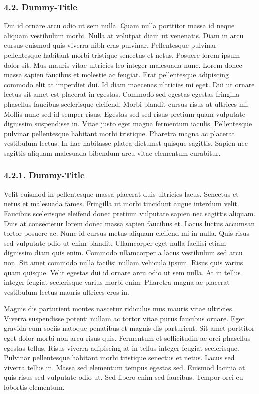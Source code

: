 \documentclass[
]{article}
\begin{document}
\hypertarget{dummy-title-4}{%
\subsubsection{4.2. Dummy-Title}\label{dummy-title-4}}

Dui id ornare arcu odio ut sem nulla. Quam nulla porttitor massa id
neque aliquam vestibulum morbi. Nulla at volutpat diam ut venenatis.
Diam in arcu cursus euismod quis viverra nibh cras pulvinar.
Pellentesque pulvinar pellentesque habitant morbi tristique senectus et
netus. Posuere lorem ipsum dolor sit. Mus mauris vitae ultricies leo
integer malesuada nunc. Lorem donec massa sapien faucibus et molestie ac
feugiat. Erat pellentesque adipiscing commodo elit at imperdiet dui. Id
diam maecenas ultricies mi eget. Dui ut ornare lectus sit amet est
placerat in egestas. Commodo sed egestas egestas fringilla phasellus
faucibus scelerisque eleifend. Morbi blandit cursus risus at ultrices
mi. Mollis nunc sed id semper risus. Egestas sed sed risus pretium quam
vulputate dignissim suspendisse in. Vitae justo eget magna fermentum
iaculis. Pellentesque pulvinar pellentesque habitant morbi tristique.
Pharetra magna ac placerat vestibulum lectus. In hac habitasse platea
dictumst quisque sagittis. Sapien nec sagittis aliquam malesuada
bibendum arcu vitae elementum curabitur.

\hypertarget{dummy-title-5}{%
\subsubsection{4.2.1. Dummy-Title}\label{dummy-title-5}}

Velit euismod in pellentesque massa placerat duis ultricies lacus.
Senectus et netus et malesuada fames. Fringilla ut morbi tincidunt augue
interdum velit. Faucibus scelerisque eleifend donec pretium vulputate
sapien nec sagittis aliquam. Duis at consectetur lorem donec massa
sapien faucibus et. Lacus luctus accumsan tortor posuere ac. Nunc id
cursus metus aliquam eleifend mi in nulla. Quis risus sed vulputate odio
ut enim blandit. Ullamcorper eget nulla facilisi etiam dignissim diam
quis enim. Commodo ullamcorper a lacus vestibulum sed arcu non. Sit amet
commodo nulla facilisi nullam vehicula ipsum. Risus quis varius quam
quisque. Velit egestas dui id ornare arcu odio ut sem nulla. At in
tellus integer feugiat scelerisque varius morbi enim. Pharetra magna ac
placerat vestibulum lectus mauris ultrices eros in.

Magnis dis parturient montes nascetur ridiculus mus mauris vitae
ultricies. Viverra suspendisse potenti nullam ac tortor vitae purus
faucibus ornare. Eget gravida cum sociis natoque penatibus et magnis dis
parturient. Sit amet porttitor eget dolor morbi non arcu risus quis.
Fermentum et sollicitudin ac orci phasellus egestas tellus. Risus
viverra adipiscing at in tellus integer feugiat scelerisque. Pulvinar
pellentesque habitant morbi tristique senectus et netus. Lacus sed
viverra tellus in. Massa sed elementum tempus egestas sed. Euismod
lacinia at quis risus sed vulputate odio ut. Sed libero enim sed
faucibus. Tempor orci eu lobortis elementum.
\end{document}

